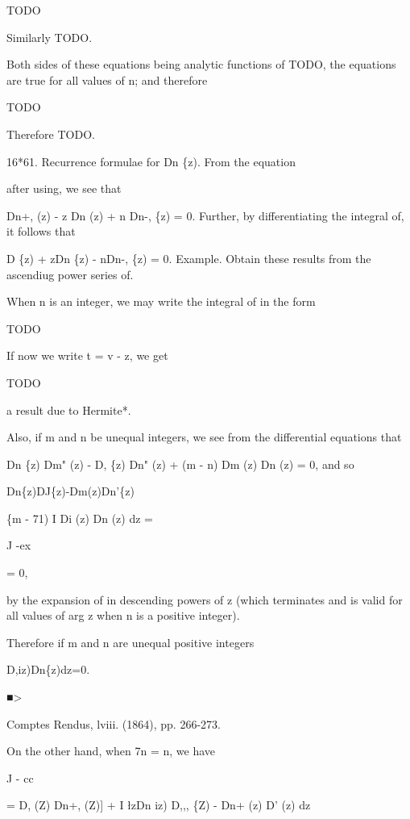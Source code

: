 TODO

Similarly TODO.

Both sides of these equations being analytic functions of TODO, the
equations are true for all values of n; and therefore

TODO

Therefore TODO.

%
%

16*61. Recurrence formulae for Dn \{z). From the equation

after using, we see that

Dn+, (z) - z Dn (z) + n Dn-, \{z) = 0. Further, by differentiating the
integral of, it follows that

D \{z) + zDn \{z) - nDn-, \{z) = 0. Example. Obtain these results
from the ascendiug power series of.


When n is an integer, we may write the integral of in the form

TODO

If now we write t = v - z, we get

TODO

a result due to Hermite*.

Also, if m and n be unequal integers, we see from the differential
equations that

Dn \{z) Dm" (z) - D, \{z) Dn" (z) + (m - n) Dm (z) Dn (z) = 0, and so

Dn\{z)DJ\{z)-Dm(z)Dn'\{z)

\{m - 71) I Di (z) Dn (z) dz =

J -ex

= 0,

by the expansion of in descending powers of z (which terminates
and is valid for all values of arg z when n is a positive integer).

Therefore if m and n are unequal positive integers

D,iz)Dn\{z)dz=0.

■>

Comptes Rendus, lviii. (1864), pp. 266-273.

%
%

On the other hand, when 7n = n, we have

J - cc

= D, (Z) Dn+, (Z)] + I \l zDn iz) D,,, \{Z) - Dn+ (z) D' (z) dz


